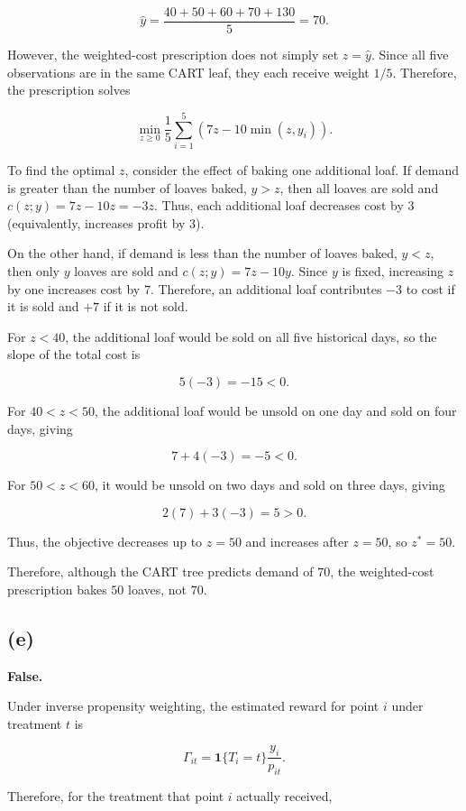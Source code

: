 \documentclass{article}
\begin{document}
$$
\hat{y}
=
\frac{40+50+60+70+130}{5}
=
70.
$$

However, the weighted-cost prescription does not simply set $z=\hat{y}$. Since all five observations are in the same CART leaf, they each receive weight $1/5$. Therefore, the prescription solves

$$
\min_{z\geq 0}
\frac{1}{5}
\sum_{i=1}^{5}
\left(7z-10\min(z,y_i)\right).
$$

To find the optimal $z$, consider the effect of baking one additional loaf. If demand is greater than the number of loaves baked, $y>z$, then all loaves are sold and $
c(z;y)=7z-10z=-3z.
$ Thus, each additional loaf decreases cost by $3$ (equivalently, increases profit by $3$).

On the other hand, if demand is less than the number of loaves baked, $y<z$, then only $y$ loaves are sold and \newline $
c(z;y)=7z-10y.
$ Since $y$ is fixed, increasing $z$ by one increases cost by $7$. Therefore, an additional loaf contributes $-3$ to cost if it is sold and $+7$ if it is not sold.

For $z<40$, the additional loaf would be sold on all five historical days, so the slope of the total cost is

$$
5(-3)=-15<0.
$$

For $40<z<50$, the additional loaf would be unsold on one day and sold on four days, giving

$$
7+4(-3)=-5<0.
$$

For $50<z<60$, it would be unsold on two days and sold on three days, giving

$$
2(7)+3(-3)=5>0.
$$

Thus, the objective decreases up to $z=50$ and increases after $z=50$, so
$ z^*=50.
$

Therefore, although the CART tree predicts demand of $70$, the weighted-cost prescription bakes $50$ loaves, not $70$.


\newpage

\subsection*{(e)}

\textbf{False.}

Under inverse propensity weighting, the estimated reward for point $i$ under treatment $t$ is

$$
\Gamma_{it}
=
\mathbf{1}\{T_i=t\}\frac{y_i}{p_{it}}.
$$

Therefore, for the treatment that point $i$ actually received,
\end{document}
